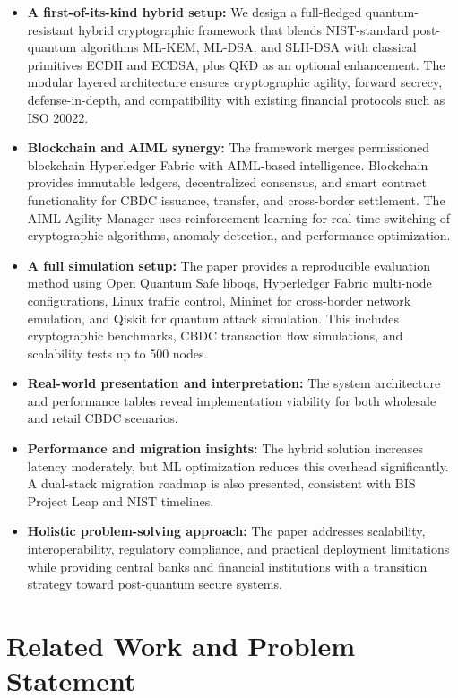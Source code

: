 \documentclass[pdflatex,sn-basic,english]{sn-jnl}
\begin{document}
\begin{itemize}
    \item \textbf{A first-of-its-kind hybrid setup:} We design a full-fledged quantum-resistant hybrid cryptographic framework that blends NIST-standard post-quantum algorithms ML-KEM, ML-DSA, and SLH-DSA with classical primitives ECDH and ECDSA, plus QKD as an optional enhancement. The modular layered architecture ensures cryptographic agility, forward secrecy, defense-in-depth, and compatibility with existing financial protocols such as ISO 20022.
    \item \textbf{Blockchain and AIML synergy:} The framework merges permissioned blockchain Hyperledger Fabric with AIML-based intelligence. Blockchain provides immutable ledgers, decentralized consensus, and smart contract functionality for CBDC issuance, transfer, and cross-border settlement. The AIML Agility Manager uses reinforcement learning for real-time switching of cryptographic algorithms, anomaly detection, and performance optimization.
    \item \textbf{A full simulation setup:} The paper provides a reproducible evaluation method using Open Quantum Safe liboqs, Hyperledger Fabric multi-node configurations, Linux traffic control, Mininet for cross-border network emulation, and Qiskit for quantum attack simulation. This includes cryptographic benchmarks, CBDC transaction flow simulations, and scalability tests up to 500 nodes.
    \item \textbf{Real-world presentation and interpretation:} The system architecture and performance tables reveal implementation viability for both wholesale and retail CBDC scenarios.
    \item \textbf{Performance and migration insights:} The hybrid solution increases latency moderately, but ML optimization reduces this overhead significantly. A dual-stack migration roadmap is also presented, consistent with BIS Project Leap and NIST timelines.
    \item \textbf{Holistic problem-solving approach:} The paper addresses scalability, interoperability, regulatory compliance, and practical deployment limitations while providing central banks and financial institutions with a transition strategy toward post-quantum secure systems.
\end{itemize}

\section{Related Work and Problem Statement}
\end{document}
